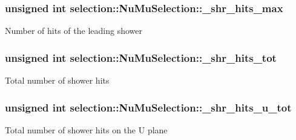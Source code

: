 \subsubsection[{\texorpdfstring{\+\_\+shr\+\_\+hits\+\_\+max}{_shr_hits_max}}]{\setlength{\rightskip}{0pt plus 5cm}unsigned int selection\+::\+Nu\+Mu\+Selection\+::\+\_\+shr\+\_\+hits\+\_\+max\hspace{0.3cm}{\ttfamily [private]}}\hypertarget{classselection_1_1NuMuSelection_ab314b2264e547d258e88d2f773352b9f}{}\label{classselection_1_1NuMuSelection_ab314b2264e547d258e88d2f773352b9f}
Number of hits of the leading shower 
\subsubsection[{\texorpdfstring{\+\_\+shr\+\_\+hits\+\_\+tot}{_shr_hits_tot}}]{\setlength{\rightskip}{0pt plus 5cm}unsigned int selection\+::\+Nu\+Mu\+Selection\+::\+\_\+shr\+\_\+hits\+\_\+tot\hspace{0.3cm}{\ttfamily [private]}}\hypertarget{classselection_1_1NuMuSelection_a9233cd2b1aa05f66da7c04f99ff99058}{}\label{classselection_1_1NuMuSelection_a9233cd2b1aa05f66da7c04f99ff99058}
Total number of shower hits 
\subsubsection[{\texorpdfstring{\+\_\+shr\+\_\+hits\+\_\+u\+\_\+tot}{_shr_hits_u_tot}}]{\setlength{\rightskip}{0pt plus 5cm}unsigned int selection\+::\+Nu\+Mu\+Selection\+::\+\_\+shr\+\_\+hits\+\_\+u\+\_\+tot\hspace{0.3cm}{\ttfamily [private]}}\hypertarget{classselection_1_1NuMuSelection_aa88c0578a68ec301fecbe3262aa44762}{}\label{classselection_1_1NuMuSelection_aa88c0578a68ec301fecbe3262aa44762}
Total number of shower hits on the U plane 

